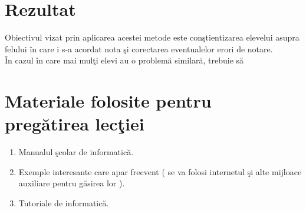 \documentclass{article}
\begin{document}

\section{Rezultat}

Obiectivul vizat prin aplicarea acestei metode este con\c stientizarea elevelui asupra felului \^ in care i s-a acordat nota \c si corectarea eventualelor erori de notare.\\
\^ In cazul \^ in care mai mul\c ti elevi au o problem\u a similar\u a, trebuie s\u a 


\section{Materiale folosite pentru preg\u atirea lec\c tiei}

\begin{enumerate}
\item Manualul \c scolar de informatic\u a.
\item Exemple interesante care apar frecvent ( se va folosi internetul \c si alte mijloace auxiliare pentru g\u asirea lor ).
\item Tutoriale de informatic\u a.
\end{enumerate}
\end{document}
